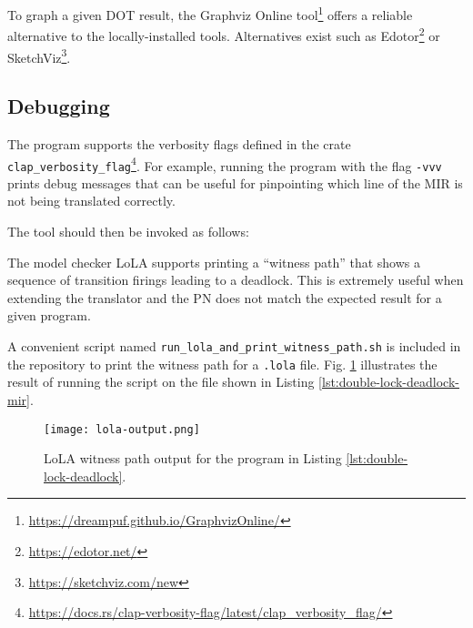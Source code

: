 To graph a given DOT result,
the Graphviz Online tool\footnote{\url{https://dreampuf.github.io/GraphvizOnline/}}
offers a reliable alternative to the locally-installed tools.
Alternatives exist such as Edotor\footnote{\url{https://edotor.net/}}
or SketchViz\footnote{\url{https://sketchviz.com/new}}.

\subsection{Debugging}
\label{sec:debugging}

The program supports the verbosity flags defined in the crate
\texttt{clap\_verbosity\_flag}\footnote{\url{https://docs.rs/clap-verbosity-flag/latest/clap\_verbosity\_flag/}}.
For example, running the program with the flag \texttt{-vvv} prints debug messages
that can be useful for pinpointing which line of the \acrshort{MIR} is not being translated correctly.

The tool should then be invoked as follows:


The model checker  \acrshort{LoLA} supports printing a ``witness path''
that shows a sequence of transition firings leading to a deadlock.
This is extremely useful when extending the translator and
the \acrshort{PN} does not match the expected result for a given program.

A convenient script named \texttt{run\_lola\_and\_print\_witness\_path.sh}
is included in the repository to print the witness path for a \texttt{.lola} file.
Fig. \ref{fig:lola-output} illustrates the result of running the script on the file
shown in Listing \ref{lst:double-lock-deadlock-mir}.

\begin{figure}[!htb]
  \centering
  \texttt{[image: lola-output.png]}
  \caption{LoLA witness path output for the program in Listing \ref{lst:double-lock-deadlock}.}
  \label{fig:lola-output}
\end{figure}